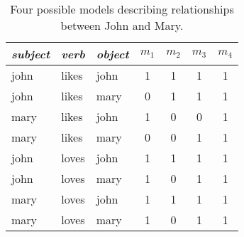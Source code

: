 \documentclass{svmult}
\begin{document}
\begin{table}
\begin{center}
\begin{tabular}{|l|l|l||c|c|c|c|}
\hline
\emph{subject} & \emph{verb} & \emph{object} & $m_1$ & $m_2$ & $m_3$ & $m_4$\\
\hline
john & likes & john & 1 & 1 & 1 & 1\\
john & likes & mary & 0 & 1 & 1 & 1\\
mary & likes & john & 1 & 0 & 0 & 1\\
mary & likes & mary & 0 & 0 & 1 & 1\\
john & loves & john & 1 & 1 & 1 & 1\\
john & loves & mary & 1 & 0 & 1 & 1\\
mary & loves & john & 1 & 1 & 1 & 1\\
mary & loves & mary & 1 & 0 & 1 & 1\\
\hline
\end{tabular}
\caption{Four possible models describing relationships between John
  and Mary.}
\end{center}
\label{table:models}
\end{table}


\end{document}
